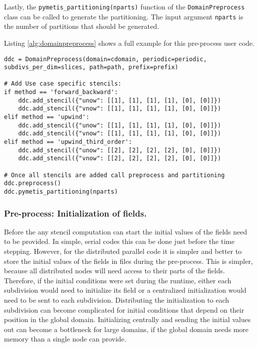 Lastly, the \texttt{pymetis\_partitioning(nparts)} function of the \texttt{DomainPreprocess} class can be called to generate the partitioning. The input argument \texttt{nparts} is the number of partitions that should be generated.

Listing \ref{alg:domainpreprocess} shows a full example for this pre-process user code.

\begin{lstlisting}[caption={Example code of the domain pre-process function calls and additional information needed to decompose a domain.},captionpos=b, label={alg:domainpreprocess}, float, floatplacement=H]
ddc = DomainPreprocess(domain=cdomain, periodic=periodic, subdivs_per_dim=slices, path=path, prefix=prefix)

# Add Use case specific stencils:
if method == 'forward_backward':
    ddc.add_stencil({"unow": [[1], [1], [1], [1], [0], [0]]})
    ddc.add_stencil({"vnow": [[1], [1], [1], [1], [0], [0]]})
elif method == 'upwind':
    ddc.add_stencil({"unow": [[1], [1], [1], [1], [0], [0]]})
    ddc.add_stencil({"vnow": [[1], [1], [1], [1], [0], [0]]})
elif method == 'upwind_third_order':
    ddc.add_stencil({"unow": [[2], [2], [2], [2], [0], [0]]})
    ddc.add_stencil({"vnow": [[2], [2], [2], [2], [0], [0]]})

# Once all stencils are added call preprocess and partitioning
ddc.preprocess()
ddc.pymetis_partitioning(nparts)
\end{lstlisting}

\subsubsection{Pre-process: Initialization of fields.}
Before the any stencil computation can start the initial values of the fields need to be provided.
In simple, serial codes this can be done just before the time stepping.
However, for the distributed parallel code it is simpler and better to store the initial values of the fields in files during the pre-process.
This is simpler, because all distributed nodes will need access to their parts of the fields.
Therefore, if the initial conditions were set during the runtime, either each subdivision would need to initialize its field or a centralized initialization would need to be sent to each subdivision.
Distributing the initialization to each subdivision can become complicated for initial conditions that depend on their position in the global domain.
Initializing centrally and sending the initial values out can become a bottleneck for large domains, if the global domain needs more memory than a single node can provide.

